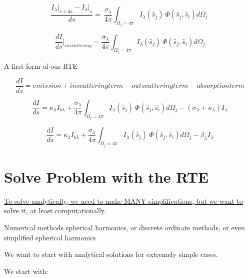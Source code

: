 \documentclass[12pt]{article}
\renewcommand{\_}{\kern-1.5pt\textunderscore\kern-1.5pt}
\begin{document}
 \[ \frac{I_{ \lambda }\vert _{s+ds} -I_{ \lambda }\vert _{s}}{ds}=~\frac{ \sigma _{ \lambda }}{4 \pi } \int _{ \Omega _{j}=4 \pi }^{}I_{ \lambda } \left( \hat{s}_{j} \right) ~ \Phi  \left( \hat{s}_{j},\hat{s}_{i} \right) d \Omega _{j}~ \] \par

 \[ \frac{dI}{ds}\vert _{inscattering}=\frac{ \sigma _{ \lambda }}{4 \pi } \int _{ \Omega _{j}=4 \pi }^{}I_{ \lambda } \left( \hat{s}_{j} \right) ~ \Phi  \left( \hat{s}_{j},\hat{s}_{i} \right) d \Omega _{j} \] \par

A first form of our RTE\par

 \[ \frac{dI}{ds}=emission+inscattering term-outscattering term-absorption term \] \par

 \[ \frac{dI}{ds}= \kappa _{ \lambda }I_{b \lambda }+\frac{ \sigma _{ \lambda }}{4 \pi } \int _{ \Omega _{j}=4 \pi }^{}I_{ \lambda } \left( \hat{s}_{j} \right) ~ \Phi  \left( \hat{s}_{j},\hat{s}_{i} \right) d \Omega _{j}- \left(  \sigma _{ \lambda }+ \kappa _{ \lambda } \right) I_{ \lambda } \] \par

 \[ \frac{dI}{ds}= \kappa _{ \lambda }I_{b \lambda }+\frac{ \sigma _{ \lambda }}{4 \pi } \int _{ \Omega _{j}=4 \pi }^{}I_{ \lambda } \left( \hat{s}_{j} \right) ~ \Phi  \left( \hat{s}_{j},\hat{s}_{i} \right) d \Omega _{j}- \beta _{ \lambda }I_{ \lambda } \] \par

\section*{Solve Problem with the RTE}
\par

\uline{To solve analytically, we need to make MANY simplifications, but we want to solve it, at least computationally.}\par

Numerical methods  spherical harmonics, or discrete ordinate methods, or even simplified spherical harmonics\par


\vspace{\baselineskip}
We want to start with analytical solutions for extremely simple cases.\par

We start with:\par
\end{document}

